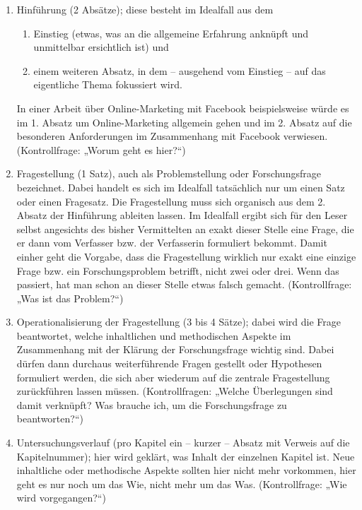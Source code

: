 \begin{enumerate}
	\item Hinführung (2 Absätze); diese besteht im Idealfall aus dem
		\begin{enumerate}
			\item Einstieg (etwas, was an die allgemeine Erfahrung
			anknüpft und unmittelbar ersichtlich ist) und
			\item einem weiteren Absatz, in dem – ausgehend vom
			Einstieg – auf das eigentliche Thema fokussiert wird.
		\end{enumerate}
		In einer Arbeit über Online-Marketing mit Facebook
		beispielsweise würde es im 1. Absatz um Online-Marketing
		allgemein gehen und im 2. Absatz auf die besonderen
		Anforderungen im Zusammenhang mit Facebook verwiesen.
		(Kontrollfrage: „Worum geht es hier?“)

	\item Fragestellung (1 Satz), auch als Problemstellung oder
	Forschungsfrage bezeichnet. Dabei handelt es sich im Idealfall
	tatsächlich nur um einen Satz oder einen Fragesatz. Die Fragestellung
	muss sich organisch aus dem 2. Absatz der Hinführung
	ableiten lassen. Im Idealfall ergibt sich für den Leser selbst
	angesichts des bisher Vermittelten an exakt dieser Stelle eine
	Frage, die er
	dann vom Verfasser bzw. der Verfasserin
	formuliert bekommt. Damit einher geht die Vorgabe, dass die
	Fragestellung wirklich nur exakt eine einzige Frage bzw. ein
	Forschungsproblem betrifft, nicht zwei oder drei. Wenn das passiert, hat
	man schon an dieser Stelle etwas falsch gemacht.  (Kontrollfrage: „Was
	ist das
		Problem?“)
	\item Operationalisierung der Fragestellung (3 bis 4 Sätze); dabei wird die Frage beantwortet, welche inhaltlichen und methodischen Aspekte im
		Zusammenhang mit der Klärung der Forschungsfrage wichtig sind. Dabei dürfen dann durchaus weiterführende Fragen gestellt oder Hypothesen
		formuliert werden, die sich aber wiederum
		auf die zentrale Fragestellung zurückführen lassen müssen. (Kontrollfragen: „Welche Überlegungen sind damit verknüpft? Was brauche ich, um
		die Forschungsfrage zu beantworten?“)
	\item Untersuchungsverlauf (pro Kapitel ein – kurzer – Absatz mit Verweis auf die Kapitelnummer); hier wird geklärt, was Inhalt der einzelnen
		Kapitel ist. Neue inhaltliche oder methodische Aspekte sollten hier nicht mehr vorkommen, hier geht es nur noch um das Wie, nicht mehr um
		das Was. (Kontrollfrage: „Wie wird
		vorgegangen?“)
\end{enumerate}

